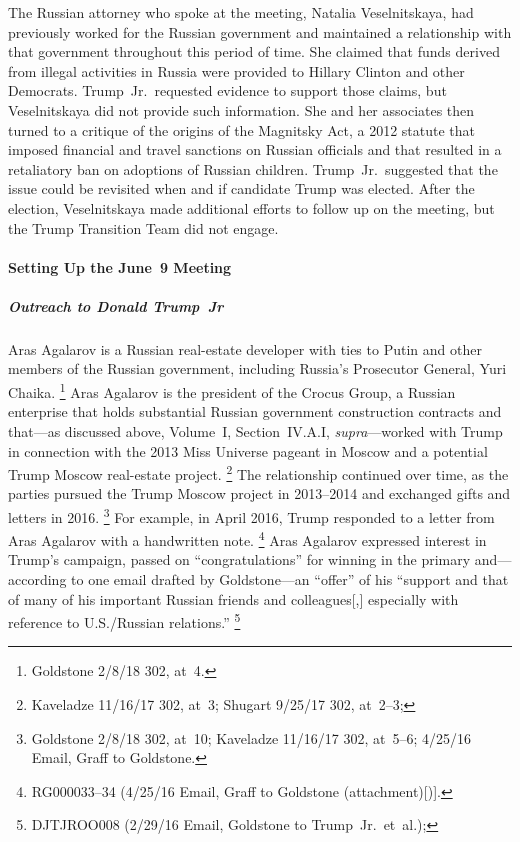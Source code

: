 The Russian attorney who spoke at the meeting, Natalia Veselnitskaya, had previously worked for the Russian government and maintained a relationship with that government throughout this period of time.
She claimed that funds derived from illegal activities in Russia were provided to Hillary Clinton and other Democrats.
Trump~Jr.\ requested evidence to support those claims, but Veselnitskaya did not provide such information.
She and her associates then turned to a critique of the origins of the Magnitsky Act, a 2012 statute that imposed financial and travel sanctions on Russian officials and that resulted in a retaliatory ban on adoptions of Russian children.
Trump~Jr.\ suggested that the issue could be revisited when and if candidate Trump was elected.
After the election, Veselnitskaya made additional efforts to follow up on the meeting, but the Trump Transition Team did not engage.

\paragraph{Setting Up the June~9 Meeting}

\subparagraph{Outreach to Donald Trump~Jr}

Aras Agalarov is a Russian real-estate developer with ties to Putin and other members of the Russian government, including Russia's Prosecutor General, Yuri Chaika.%
\footnote{ Goldstone 2/8/18 302, at~4.}
Aras Agalarov is the president of the Crocus Group, a Russian enterprise that holds substantial Russian government construction contracts and that---as discussed above, Volume~I, Section~IV.A.I, \textit{supra}---worked with Trump in connection with the 2013 Miss Universe pageant in Moscow and a potential Trump Moscow real-estate project.%
\footnote{ Kaveladze 11/16/17 302, at~3;
Shugart 9/25/17 302, at~2--3;
}
The relationship continued over time, as the parties pursued the Trump Moscow project in 2013--2014 and exchanged gifts and letters in 2016.%
\footnote{ Goldstone 2/8/18 302, at~10;
 Kaveladze 11/16/17 302, at~5--6;
4/25/16 Email, Graff to Goldstone.}
For example, in April 2016, Trump responded to a letter from Aras Agalarov with a handwritten note.%
\footnote{RG000033--34 (4/25/16 Email, Graff to Goldstone (attachment)[)].}
Aras Agalarov expressed interest in Trump's campaign, passed on ``congratulations'' for winning in the primary and---according to one email drafted by Goldstone---an ``offer'' of his ``support and that of many of his important Russian friends and colleagues[,] especially with reference to U.S./Russian relations.''%
\footnote{DJTJROO008 (2/29/16 Email, Goldstone to Trump~Jr.\ et~al.);
}

